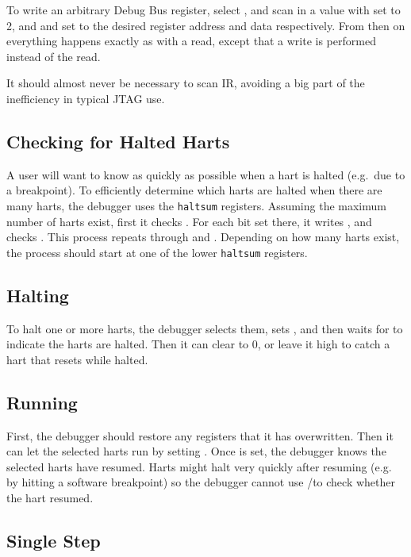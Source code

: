 To write an arbitrary Debug Bus register, select \RdtmDmi, and scan in a value
with \FdtmDmiOp set to 2, and \FdmSbaddressZeroAddress and \FdmSbdataZeroData set to the desired register
address and data respectively. From then on everything happens exactly as with
a read, except that a write is performed instead of the read.

It should almost never be necessary to scan IR, avoiding a big part of the
inefficiency in typical JTAG use.

\subsection{Checking for Halted Harts}

A user will want to know as quickly as possible when a hart is halted (e.g.\ due
to a breakpoint).  To efficiently determine which harts are halted when there
are many harts, the debugger uses the {\tt haltsum} registers. Assuming the
maximum number of harts exist, first it checks \RdmHaltsumThree. For each bit set
there, it writes \Fhartsel, and checks \RdmHaltsumTwo. This process repeats
through \RdmHaltsumOne and \RdmHaltsumZero. Depending on how many harts exist, the
process should start at one of the lower {\tt haltsum} registers.

\subsection{Halting} \label{deb:halt}

To halt one or more harts, the debugger selects them, sets \FdmDmcontrolHaltreq, and then
waits for \FdmDmstatusAllhalted to indicate the harts are halted. Then it can clear
\FdmDmcontrolHaltreq to 0, or leave it high to catch a hart that resets while halted.

\subsection{Running}

First, the debugger should restore any registers that it has overwritten.
Then it can let the selected harts run by setting \FdmDmcontrolResumereq. Once
\FdmDmstatusAllresumeack is set, the debugger knows the selected harts have resumed.
Harts might halt very quickly after resuming (e.g.
by hitting a software breakpoint) so the debugger cannot use
\FdmDmstatusAllhalted/\FdmDmstatusAnyhalted to check whether the hart resumed.

\subsection{Single Step}

